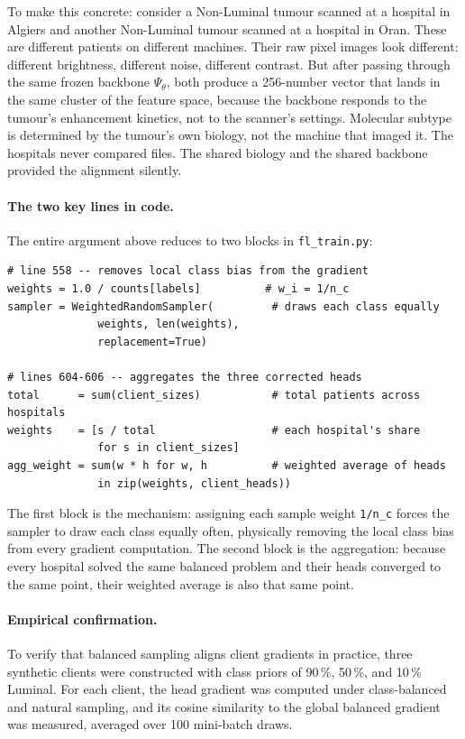 To make this concrete: consider a Non-Luminal tumour
scanned at a hospital in Algiers and another Non-Luminal
tumour scanned at a hospital in Oran.
These are different patients on different machines.
Their raw pixel images look different: different
brightness, different noise, different contrast.
But after passing through the same frozen backbone
$\Psi_\theta$, both produce a 256-number vector that
lands in the same cluster of the feature space, because
the backbone responds to the tumour's enhancement
kinetics, not to the scanner's settings.
Molecular subtype is determined by the tumour's own
biology, not the machine that imaged it.
The hospitals never compared files.
The shared biology and the shared backbone provided the
alignment silently.

\paragraph{The two key lines in code.}
The entire argument above reduces to two blocks
in \texttt{fl\_train.py}:

\begin{verbatim}
# line 558 -- removes local class bias from the gradient
weights = 1.0 / counts[labels]          # w_i = 1/n_c
sampler = WeightedRandomSampler(         # draws each class equally
              weights, len(weights),
              replacement=True)

# lines 604-606 -- aggregates the three corrected heads
total      = sum(client_sizes)           # total patients across hospitals
weights    = [s / total                  # each hospital's share
              for s in client_sizes]
agg_weight = sum(w * h for w, h          # weighted average of heads
              in zip(weights, client_heads))
\end{verbatim}

The first block is the mechanism: assigning each sample
weight \texttt{1/n\_c} forces the sampler to draw each
class equally often, physically removing the local class
bias from every gradient computation.
The second block is the aggregation: because every
hospital solved the same balanced problem and their heads
converged to the same point, their weighted average is
also that same point.

\paragraph{Empirical confirmation.}
To verify that balanced sampling aligns client gradients
in practice, three synthetic clients were constructed with
class priors of 90\,\%, 50\,\%, and 10\,\% Luminal.
For each client, the head gradient was computed under
class-balanced and natural sampling, and its cosine
similarity to the global balanced gradient was measured,
averaged over 100 mini-batch draws.

